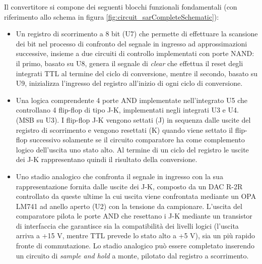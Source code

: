 \documentclass[journal]{IEEEtran}
\begin{document}
Il convertitore si compone dei seguenti blocchi funzionali fondamentali (con riferimento allo schema in figura \ref{fig:circuit_sarCompleteSchematic}):
\begin{itemize}
    \item Un registro di scorrimento a 8 bit (U7) che permette di effettuare la scansione dei bit nel processo di confronto del segnale in ingresso ad approssimazioni successive, insieme a due circuiti di controllo implementati con porte NAND: il primo, basato su U8, genera il segnale di \textit{clear} che effettua il reset degli integrati TTL al termine del ciclo di conversione, mentre il secondo, basato su U9, inizializza l'ingresso del registro all'inizio di ogni ciclo di conversione.
    \item Una logica comprendente 4 porte AND implementate nell'integrato U5 che controllano 4 flip-flop di tipo J-K, implementati negli integrati U3 e U4. (MSB su U3). I flip-flop J-K vengono settati (J) in sequenza dalle uscite del registro di scorrimento e vengono resettati (K) quando viene settato il flip-flop successivo solamente se il circuito comparatore ha come complemento logico dell'uscita uno stato alto. Al termine di un ciclo del registro le uscite dei J-K rappresentano quindi il risultato della conversione.
    \item Uno stadio analogico che confronta il segnale in ingresso con la sua rappresentazione fornita dalle uscite dei J-K, composto da un DAC R-2R controllato da queste ultime la cui uscita viene confrontata mediante un OPA LM741 ad anello aperto (U2) con la tensione da campionare. L'uscita del comparatore pilota le porte AND che resettano i J-K mediante un transistor di interfaccia che garantisce sia la compatibilità dei livelli logici (l'uscita arriva a +15 V, mentre TTL prevede lo stato alto a +5 V), sia un più rapido fronte di commutazione. Lo stadio analogico può essere completato inserendo un circuito di \textit{sample and hold} a monte, pilotato dal registro a scorrimento.
    
\end{itemize}
 

\end{document}
